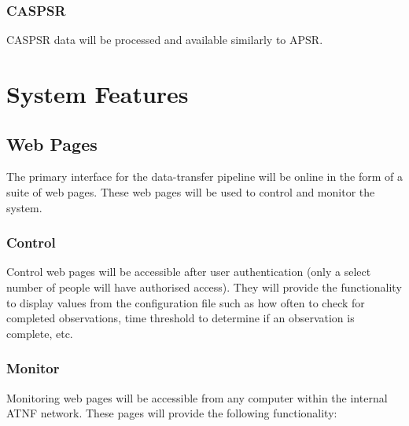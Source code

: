 \documentclass[a4paper,11pt]{article}
\begin{document}
\subsubsection{CASPSR}
CASPSR data will be processed and available similarly to APSR.

\section{System Features}

\subsection{Web Pages}
The primary interface for the data-transfer pipeline will be online in the form of a suite of web pages. These web pages will be used to control and monitor the system.

\subsubsection{Control}
Control web pages will be accessible after user authentication (only a select number of people will have authorised access). They will provide the functionality to display values from the configuration file such as how often to check for completed observations, time threshold to determine if an observation is complete, etc.


\subsubsection{Monitor}
Monitoring web pages will be accessible from any computer within the internal ATNF network. These pages will provide the following functionality:
\end{document}
